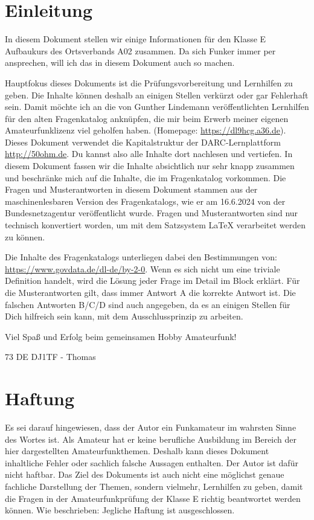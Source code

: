 \section*{Einleitung}
In diesem Dokument stellen wir einige Informationen für den Klasse E Aufbaukurs des Ortsverbands A02 zusammen.
Da sich Funker immer per  ansprechen, will ich das in diesem Dokument auch so machen.


Hauptfokus dieses Dokuments ist die Prüfungsvorbereitung und Lernhilfen zu geben. Die Inhalte können deshalb an einigen Stellen verkürzt oder gar Fehlerhaft sein. Damit möchte ich an die von Gunther Lindemann veröffentlichten Lernhilfen für den alten Fragenkatalog anknüpfen, die mir beim Erwerb meiner eigenen Amateurfunklizenz viel geholfen haben. (Homepage: \href{https://dl9hcg.a36.de}{https://dl9hcg.a36.de}).
Dieses Dokument verwendet die Kapitalstruktur der DARC-Lernplattform \url{http://50ohm.de}. Du kannst also alle Inhalte dort nachlesen und vertiefen. In diesem Dokument fassen wir die Inhalte absichtlich nur sehr knapp zusammen und beschränke mich auf die Inhalte, die im Fragenkatalog vorkommen.
Die Fragen und Musterantworten in diesem Dokument stammen aus der maschinenlesbaren Version des Fragenkatalogs, wie er am 16.6.2024 von der Bundesnetzagentur veröffentlicht wurde. Fragen und Musterantworten sind nur technisch konvertiert worden, um mit dem Satzsystem LaTeX verarbeitet werden zu können.

Die Inhalte des Fragenkatalogs unterliegen dabei den Bestimmungen von: \href{https://www.govdata.de/dl-de/by-2-0}{https://www.govdata.de/dl-de/by-2-0}.
Wenn es sich nicht um eine triviale Definition handelt, wird die Lösung jeder Frage im Detail im Block  erklärt.
Für die Musterantworten gilt, dass immer Antwort A die korrekte Antwort ist. Die falschen Antworten B/C/D sind auch angegeben, da es an einigen Stellen für Dich hilfreich sein kann, mit dem Ausschlussprinzip zu arbeiten.


Viel Spaß und Erfolg beim gemeinsamen Hobby Amateurfunk!

73 DE DJ1TF - Thomas

\section*{Haftung}
Es sei darauf hingewiesen, dass der Autor ein Funkamateur im wahrsten Sinne des Wortes ist. Als Amateur hat er keine berufliche Ausbildung im Bereich der hier dargestellten Amateurfunkthemen. 
Deshalb kann dieses Dokument inhaltliche Fehler oder sachlich falsche Aussagen enthalten. Der Autor ist dafür nicht haftbar.
Das Ziel des Dokuments ist auch nicht eine möglichst genaue fachliche Darstellung der Themen, sondern vielmehr, Lernhilfen zu geben, damit die Fragen in der Amateurfunkprüfung der Klasse E richtig beantwortet werden können.
Wie beschrieben: Jegliche Haftung ist ausgeschlossen.



